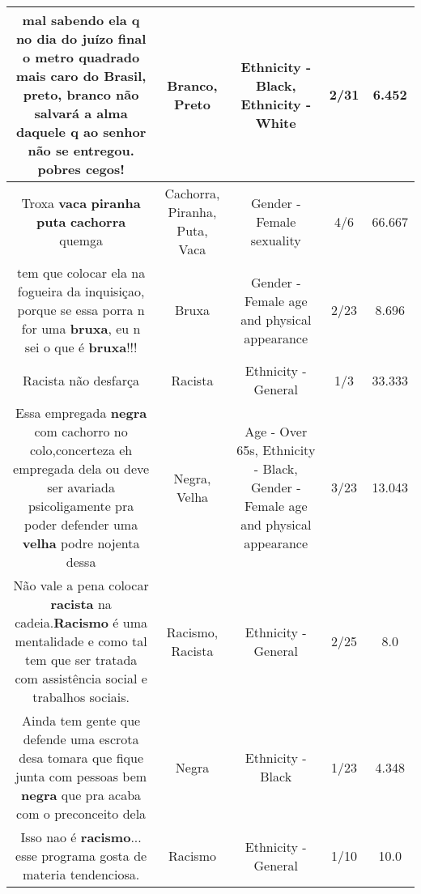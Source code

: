 \documentclass[11pt]{article}
\newlength\mylength
\begin{document}
\begin{center}
\begin{longtable}{|C{.65\mylength}|C{.30\mylength}|C{.12\mylength}|C{.12\mylength}|C{.12\mylength}|}
  \small mal sabendo ela q no dia do juízo final o metro quadrado mais caro do Brasil, \textbf{preto}, \textbf{branco} não salvará a alma daquele q ao senhor não se entregou. pobres cegos!\normalsize   & Branco, Preto & Ethnicity - Black, Ethnicity - White & 2/31 & 6.452 \\  \hline
  \small Troxa \textbf{vaca} \textbf{piranha} \textbf{puta} \textbf{cachorra} quemga\normalsize   & Cachorra, Piranha, Puta, Vaca & Gender - Female sexuality & 4/6 & 66.667 \\  \hline
  \small tem que colocar ela na fogueira da inquisiçao, porque se essa porra n for uma \textbf{bruxa}, eu n sei o que é \textbf{bruxa}!!!\normalsize   & Bruxa & Gender - Female age and physical appearance & 2/23 & 8.696 \\  \hline
  \small Racista não desfarça\normalsize   & Racista & Ethnicity - General & 1/3 & 33.333 \\  \hline
  \small Essa empregada \textbf{negra} com cachorro no colo,concerteza eh empregada dela ou deve ser avariada psicoligamente pra poder  defender uma \textbf{v\textbf{elha}} podre nojenta dessa\normalsize   & Negra, Velha & Age - Over 65s, Ethnicity - Black, Gender - Female age and physical appearance & 3/23 & 13.043 \\  \hline
  \small Não vale a pena colocar \textbf{racista} na cadeia.\textbf{Racismo} é uma mentalidade e como tal tem que ser tratada com assistência social e trabalhos sociais.\normalsize   & Racismo, Racista & Ethnicity - General & 2/25 & 8.0 \\  \hline
  \small Ainda tem gente que defende uma escrota  desa  tomara que fique junta com    pessoas bem \textbf{negra}   que pra acaba com o preconceito dela\normalsize   & Negra & Ethnicity - Black & 1/23 & 4.348 \\  \hline
  \small Isso nao é \textbf{racismo}... esse programa gosta de materia tendenciosa.\normalsize   & Racismo & Ethnicity - General & 1/10 & 10.0 \\  \hline

\end{longtable}
\end{center}
\end{document}
